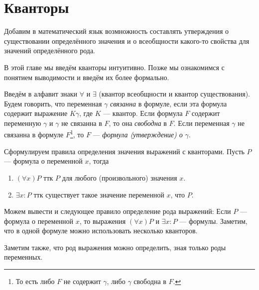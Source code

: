 \section{Кванторы}

Добавим в математический язык возмножность составлять утверждения о существовании
определённого значения и о всеобщности какого-то свойства для значений
определённого рода.

В этой главе мы введём кванторы интуитивно. Позже мы ознакомимся с понятием
выводимости и введём их более формально.

Введём в алфавит знаки $\forall$ и $\exists$ (квантор всеобщности и
квантор существования). Будем говорить, что переменная $\gamma$
{\it связанна} в формуле, если эта формула содержит выражение $K\gamma$,
где $K$ --- квантор. Если формула $F$ содержит переменную $\gamma$ и $\gamma$
не связанна в $F$, то она {\it свободна} в $F$. Если переменная $\gamma$
не связанна в формуле $F$\footnote{
	То есть либо $F$ не содержит $\gamma$, либо $\gamma$ свободна в $F$.
}, то $F$ --- {\it формула (утверждение) о} $\gamma$.

Сформулируем правила определения значения выражений с кванторами.
Пусть $P$ --- формула о переменной $x$, тогда
\begin{enumerate}
	\item{}$(\forall x)P$ ттк $P$ для любого (произвольного) значения $x$.
	\item{}$\exists x:P$ ттк существует такое значение переменной $x$, что $P$.
\end{enumerate}

Можем вывести и следующее правило определение рода выражений:
Если $P$ --- формула о переменной $x$,
то выражения $(\forall x)P$ и ${\exists x:P}$ --- формулы.
Заметим, что в одной формуле можно использовать несколько кванторов.

Заметим также, что род выражения можно определить, зная только роды переменных.

